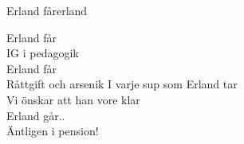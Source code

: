 \begin{song}{Erland får}{erland}
\begin{vers}
Erland får\\
IG i pedagogik\\
Erland får\\
Råttgift och arsenik
I varje sup som Erland tar\\
Vi önskar att han vore klar\\
Erland går..\\
Äntligen i pension!\\
\end{vers}
\end{song}
